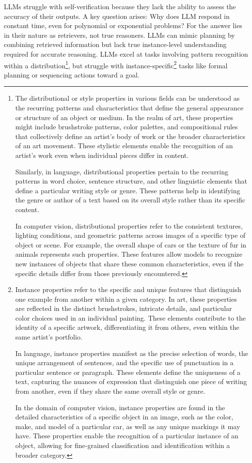 LLMs struggle with self-verification because they lack the ability to assess the accuracy of their outputs.
A key question arises: Why does LLM respond in constant time, even for polynomial or exponential problems?
For \textcite{subbarao2024canlanguagemodelsreasonplan, kambhampati2024llmscantplanhelp} the answer lies in their nature as retrievers, not true reasoners.
LLMs can mimic planning by combining retrieved information but lack true instance-level understanding required for accurate reasoning.
LLMs excel at tasks involving pattern recognition within a distribution\footnote{The distributional or style properties in various fields can be understood as the recurring patterns and characteristics that define the general appearance or structure of an object or medium. In the realm of art, these properties might include brushstroke patterns, color palettes, and compositional rules that collectively define an artist's body of work or the broader characteristics of an art movement. These stylistic elements enable the recognition of an artist's work even when individual pieces differ in content.

	Similarly, in language, distributional properties pertain to the recurring patterns in word choice, sentence structure, and other linguistic elements that define a particular writing style or genre. These patterns help in identifying the genre or author of a text based on its overall style rather than its specific content.

	In computer vision, distributional properties refer to the consistent textures, lighting conditions, and geometric patterns across images of a specific type of object or scene. For example, the overall shape of cars or the texture of fur in animals represents such properties. These features allow models to recognize new instances of objects that share these common characteristics, even if the specific details differ from those previously encountered.
}, but struggle with instance-specific\footnote{
	Instance properties refer to the specific and unique features that distinguish one example from another within a given category. In art, these properties are reflected in the distinct brushstrokes, intricate details, and particular color choices used in an individual painting. These elements contribute to the identity of a specific artwork, differentiating it from others, even within the same artist's portfolio.

	In language, instance properties manifest as the precise selection of words, the unique arrangement of sentences, and the specific use of punctuation in a particular sentence or paragraph. These elements define the uniqueness of a text, capturing the nuances of expression that distinguish one piece of writing from another, even if they share the same overall style or genre.

	In the domain of computer vision, instance properties are found in the detailed characteristics of a specific object in an image, such as the color, make, and model of a particular car, as well as any unique markings it may have. These properties enable the recognition of a particular instance of an object, allowing for fine-grained classification and identification within a broader category.
} tasks like formal planning or sequencing actions toward a goal.
